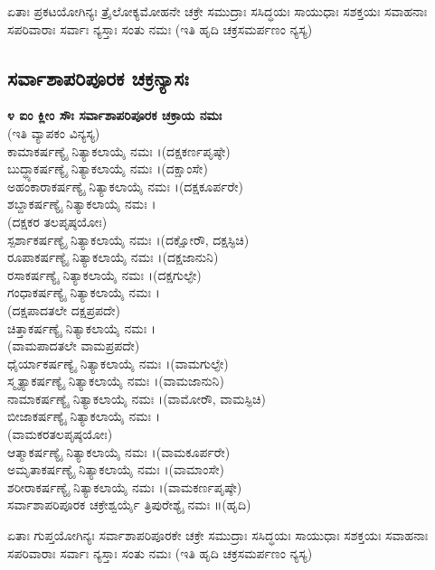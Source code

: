  ಏತಾಃ ಪ್ರಕಟಯೋಗಿನ್ಯಃ ತ್ರೈಲೋಕ್ಯಮೋಹನೇ ಚಕ್ರೇ ಸಮುದ್ರಾಃ ಸಸಿದ್ಧಯಃ ಸಾಯುಧಾಃ ಸಶಕ್ತಯಃ ಸವಾಹನಾಃ ಸಪರಿವಾರಾಃ ಸರ್ವಾಃ ನ್ಯಸ್ತಾಃ ಸಂತು ನಮಃ (ಇತಿ ಹೃದಿ ಚಕ್ರಸಮರ್ಪಣಂ ನ್ಯಸ್ಯ)
\subsection{ಸರ್ವಾಶಾಪರಿಪೂರಕ ಚಕ್ರನ್ಯಾಸಃ}
{\bfseries ೪ ಐಂ ಕ್ಲೀಂ ಸೌಃ ಸರ್ವಾಶಾಪರಿಪೂರಕ ಚಕ್ರಾಯ ನಮಃ}\\(ಇತಿ ವ್ಯಾಪಕಂ ವಿನ್ಯಸ್ಯ)\\
 ಕಾಮಾಕರ್ಷಣ್ಯೈ ನಿತ್ಯಾಕಲಾಯೈ ನಮಃ ।(ದಕ್ಷಕರ್ಣಪೃಷ್ಠೇ)\\
 ಬುದ್ಧ್ಯಾಕರ್ಷಣ್ಯೈ ನಿತ್ಯಾಕಲಾಯೈ ನಮಃ ।(ದಕ್ಷಾಂಸೇ)\\
 ಅಹಂಕಾರಾಕರ್ಷಣ್ಯೈ ನಿತ್ಯಾಕಲಾಯೈ ನಮಃ ।(ದಕ್ಷಕೂರ್ಪರೇ)\\
 ಶಬ್ದಾಕರ್ಷಣ್ಯೈ ನಿತ್ಯಾಕಲಾಯೈ ನಮಃ ।\\(ದಕ್ಷಕರ ತಲಪೃಷ್ಠಯೋಃ)\\
 ಸ್ಪರ್ಶಾಕರ್ಷಣ್ಯೈ ನಿತ್ಯಾಕಲಾಯೈ ನಮಃ ।(ದಕ್ಷೋರೌ, ದಕ್ಷಸ್ಫಿಚಿ)\\
 ರೂಪಾಕರ್ಷಣ್ಯೈ ನಿತ್ಯಾಕಲಾಯೈ ನಮಃ ।(ದಕ್ಷಜಾನುನಿ)\\
 ರಸಾಕರ್ಷಣ್ಯೈ ನಿತ್ಯಾಕಲಾಯೈ ನಮಃ ।(ದಕ್ಷಗುಲ್ಫೇ)\\
 ಗಂಧಾಕರ್ಷಣ್ಯೈ ನಿತ್ಯಾಕಲಾಯೈ ನಮಃ ।\\(ದಕ್ಷಪಾದತಲೇ ದಕ್ಷಪ್ರಪದೇ)\\
 ಚಿತ್ತಾಕರ್ಷಣ್ಯೈ ನಿತ್ಯಾಕಲಾಯೈ ನಮಃ ।\\(ವಾಮಪಾದತಲೇ ವಾಮಪ್ರಪದೇ)\\
 ಧೈರ್ಯಾಕರ್ಷಣ್ಯೈ ನಿತ್ಯಾಕಲಾಯೈ ನಮಃ ।(ವಾಮಗುಲ್ಫೇ)\\
 ಸ್ಮೃತ್ಯಾಕರ್ಷಣ್ಯೈ ನಿತ್ಯಾಕಲಾಯೈ ನಮಃ ।(ವಾಮಜಾನುನಿ)\\
 ನಾಮಾಕರ್ಷಣ್ಯೈ ನಿತ್ಯಾಕಲಾಯೈ ನಮಃ ।(ವಾಮೋರೌ, ವಾಮಸ್ಫಿಚಿ)\\
 ಬೀಜಾಕರ್ಷಣ್ಯೈ ನಿತ್ಯಾಕಲಾಯೈ ನಮಃ ।\\(ವಾಮಕರತಲಪೃಷ್ಠಯೋಃ)\\
 ಆತ್ಮಾಕರ್ಷಣ್ಯೈ ನಿತ್ಯಾಕಲಾಯೈ ನಮಃ ।(ವಾಮಕೂರ್ಪರೇ)\\
 ಅಮೃತಾಕರ್ಷಣ್ಯೈ ನಿತ್ಯಾಕಲಾಯೈ ನಮಃ ।(ವಾಮಾಂಸೇ)\\
 ಶರೀರಾಕರ್ಷಣ್ಯೈ ನಿತ್ಯಾಕಲಾಯೈ ನಮಃ ।(ವಾಮಕರ್ಣಪೃಷ್ಠೇ)\\
 ಸರ್ವಾಶಾಪರಿಪೂರಕ ಚಕ್ರೇಶ್ವರ್ಯೈ ತ್ರಿಪುರೇಶ್ಯೈ ನಮಃ ॥(ಹೃದಿ)

 ಏತಾಃ ಗುಪ್ತಯೋಗಿನ್ಯಃ ಸರ್ವಾಶಾಪರಿಪೂರಕೇ ಚಕ್ರೇ ಸಮುದ್ರಾಃ ಸಸಿದ್ಧಯಃ ಸಾಯುಧಾಃ ಸಶಕ್ತಯಃ ಸವಾಹನಾಃ ಸಪರಿವಾರಾಃ ಸರ್ವಾಃ ನ್ಯಸ್ತಾಃ ಸಂತು ನಮಃ (ಇತಿ ಹೃದಿ ಚಕ್ರಸಮರ್ಪಣಂ ನ್ಯಸ್ಯ)

